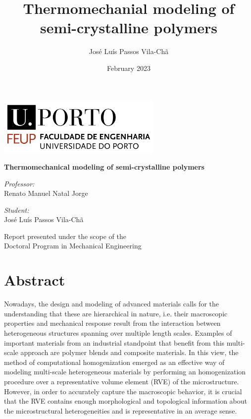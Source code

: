 \documentclass[a4paper, openright, twoside]{report}
\title{Thermomechanial modeling of semi-crystalline polymers}
\author{José Luís Passos Vila-Chã}
\date{February 2023}
\begin{document}
\begin{titlepage}
\thispagestyle{firststyle}
\begin{center}
   \begin{minipage}[c][10cm][l]{0.9\textwidth}

        \includegraphics[width=0.6\textwidth]{figures/university}

        \vspace{3.5cm}
        \huge
       \textbf{Thermomechanical modeling of semi-crystalline polymers}

       \vspace{1.5cm}
        \small
       \textit{Professor:}\\
       \normalsize
       Renato Manuel Natal Jorge 	 	\\

       \vspace{0.5cm}


         \small
        \textit{Student:}\\
        \vspace{0.5cm}
       \normalsize
       \!José Luís Passos Vila-Chã
       \vspace{7.5cm}


        \centering
        \small
       Report presented under the scope of the\\ Doctoral Program in Mechanical Engineering

   \end{minipage}
   \end{center}
\end{titlepage}

\newpage\null\thispagestyle{blank}\newpage
\chapter*{Abstract}

Nowadays, the design and modeling of advanced materials calls for the understanding that these are hierarchical in nature, i.e. their macroscopic properties and mechanical response result from the interaction between heterogeneous structures spanning over multiple length scales.
Examples of important materials from an industrial standpoint that benefit from this multi-scale approach are polymer blends and composite materials.
In this view, the method of computational homogenization emerged as an effective way of modeling multi-scale heterogeneous materials by performing an homogenization procedure over a representative volume element (RVE) of the microstructure.
However, in order to accurately capture the macroscopic behavior, it is crucial that the RVE contains enough morphological and topological information about the microstructural heterogeneities and is representative in an average sense.
\end{document}
